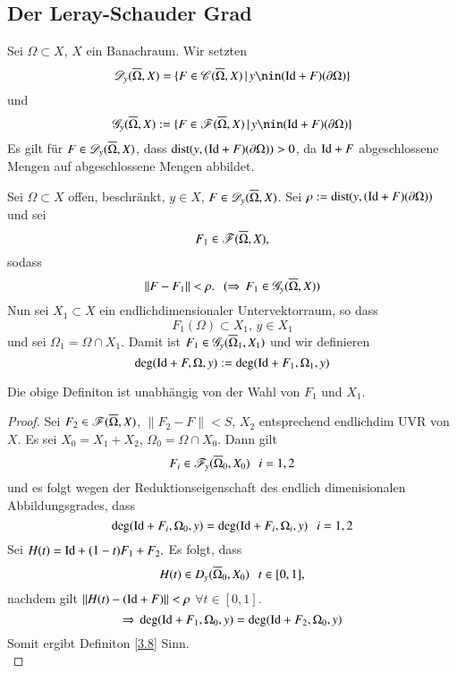 \subsection{Der Leray-Schauder Grad}

Sei $\Omega\subset X$, $X$ ein Banachraum. Wir setzten
\[
    \ms D_y(\ol \Omega,X)=\{ F\in \ms C(\ol\Omega,X)\, | \, y\nin(\Id + F)(\partial \Omega) \}
\]
und
\[
    \ms G_y(\ol\Omega,X):=\{F\in \ms F(\ol \Omega,X)\, |\, y\nin(\Id+F)(\partial\Omega)\}
\]
Es gilt für $F\in \mathscr D_y(\overline \Omega,X)$, dass $\mathrm{dist}(y,(\mathrm{Id}+F)(\partial\Omega))>0$, da $\mathrm{Id}+F$
abgeschlossene Mengen auf abgeschlossene Mengen abbildet.

\begin{defi}{\label{3.8}}
    Sei $\Omega\subset X$ offen, beschränkt, $y\in X$, $F\in \mathscr D_y(\overline \Omega,X)$. Sei $\rho:=
    \mathrm{dist}(y,(\mathrm{Id}+F)(\partial \Omega))$ und sei
    \[
        F_1\in \mathscr F(\overline \Omega, X),
    \]
    sodass
    \[
        \|F-F_1\|<\rho. \hspace{.25cm} (\Rightarrow \, F_1\in \mathscr G_y(\overline \Omega,X))
    \]
    Nun sei $X_1\subset X$ ein endlichdimensionaler Untervektorraum, so dass
    \[
        F_1(\Omega)\subset X_1,\, y\in X_1
    \] 
    und sei $\Omega_1=\Omega\cap X_1$. Damit ist $F_1\in \mathscr G_y(\overline\Omega_1,X_1)$ und wir definieren
    \[
        \deg(\mathrm{Id}+F,\Omega,y):=\deg(\mathrm{Id}+F_1,\Omega_1,y)
    \]
\end{defi}

\begin{prop}\label{3.9}
    Die obige Definiton ist unabhängig von der Wahl von $F_1$ und $X_1$.
\end{prop}

\begin{proof}
    Sei $F_2\in \mathscr F (\overline \Omega,X)$, $\|F_2-F\|<S$, $X_2$ entsprechend endlichdim UVR von $X$. Es sei
    $X_0=X_1+X_2$, $\Omega_0=\Omega\cap X_0$. Dann gilt
    \[
        F_i\in \mathscr F_y(\overline\Omega_0,X_0) \hspace{.25cm} i=1,2
    \]
    und es folgt wegen der Reduktionseigenschaft des endlich dimenisionalen Abbildungsgrades, dass
    \[
        \deg(\mathrm{Id} + F_i,\Omega_0,y)=\deg(\mathrm{Id}+F_i,\Omega_i,y)\hspace{.25cm} i=1,2
    \]
    Sei $H(t)=\mathrm{Id} + (1-t)F_1+F_2.$ Es folgt, dass
    \[
        H(t)\in D_y(\overline\Omega_0,X_0) \hspace{.25cm} t\in [0,1],
    \]
    nachdem gilt $\|H(t)-(\mathrm{Id}+F)\|<\rho$ $\forall t\in [0,1]$.
    \[
        \Rightarrow \, \deg(\mathrm{Id}+F_1,\Omega_0,y)=\deg(\mathrm{Id}+F_2,\Omega_0,y)
    \]
    Somit ergibt Definiton \ref{3.8} Sinn.
    \[ \]
\end{proof}

